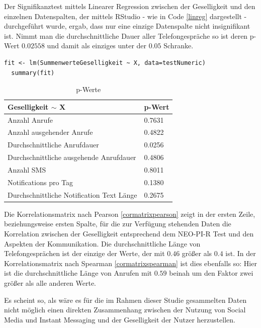 Der Signifikanztest mittels Linearer Regression zwischen der Geselligkeit und den einzelnen Datenspalten, der mittels RStudio - wie in Code \ref{linreg} dargestellt - durchgeführt wurde, ergab, 
dass nur eine einzige Datenspalte nicht insignifikant ist.
Nimmt man die durchschnittliche Dauer aller Telefongespräche so ist deren p-Wert $0.02558$ und damit als einziges unter der $0.05$ Schranke.

\begin{lstlisting}[frame=single, caption = Lineare Regression, label=linreg] 
  fit <- lm(SummenwerteGeselligkeit ~ X, data=testNumeric)
  summary(fit)
\end{lstlisting}

\begin{table}[]
\centering
\caption{p-Werte}
\label{pvalues}
\begin{tabular}{@{}ll@{}}
\toprule
Geselligkeit $\sim$ X                     & p-Wert \\ \midrule
Anzahl Anrufe                             & 0.7631 \\
Anzahl ausgehender Anrufe                 & 0.4822 \\
Durchschnittliche Anrufdauer              & 0.0256 \\
Durchschnittliche ausgehende Anrufdauer   & 0.4806 \\
Anzahl SMS                                & 0.8011 \\
Notifications pro Tag                     & 0.1380 \\
Durchschnittliche Notification Text Länge & 0.2675 \\ \bottomrule
\end{tabular}
\end{table}

Die Korrelationsmatrix nach Pearson \ref{cormatrixpearson} zeigt in der ersten Zeile, beziehungsweise ersten Spalte, für die zur Verfügung stehenden Daten die Korrelation zwischen der Geselligkeit entsprechend dem NEO-PI-R Test und den Aspekten der Kommunikation.
Die durchschnittliche Länge von Telefongesprächen ist der einzige der Werte, der mit $0.46$ größer als $0.4$ ist.
In der Korrelationsmatrix nach Spearman \ref{cormatrixspearman} ist dies ebenfalls so: Hier ist die durchschnittliche Länge von Anrufen mit $0.59$ beinah um den Faktor zwei größer als alle anderen Werte.

\par
Es scheint so, als wäre es für die im Rahmen dieser Studie gesammelten Daten nicht möglich einen direkten Zusammenhang zwischen der Nutzung von Social Media und Instant Messaging und der Geselligkeit der Nutzer herzustellen.

